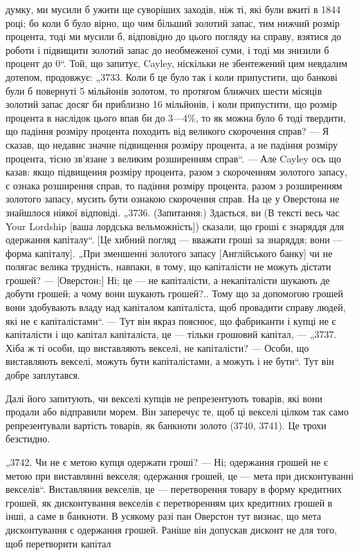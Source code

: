 думку, ми мусили б ужити ще суворіших заходів, ніж ті, які
були вжиті в 1844 році; бо коли б було вірно, що чим більший
золотий запас, тим нижчий розмір процента, тоді ми мусили б,
відповідно до цього погляду на справу, взятися до роботи і підвищити золотий запас до необмеженої
суми, і тоді ми знизили б
процент до 0“. Той, що запитує, Cayley, ніскільки не збентежений цим невдалим дотепом, продовжує:
„3733. Коли б це
було так і коли припустити, що банкові були б повернуті
5 мільйонів золотом, то протягом ближчих шести місяців золотий запас досяг би приблизно 16
мільйонів, і коли припустити,
що розмір процента в наслідок цього впав би до 3—4\%, то
як можна було б тоді твердити, що падіння розміру процента
походить від великого скорочення справ? — Я сказав, що недавнє значне підвищення розміру процента, а
не падіння розміру
процента, тісно зв’язане з великим розширенням справ“. — Але
Cayley ось що казав: якщо підвищення розміру процента, разом з скороченням золотого запасу, є ознака
розширення справ,
то падіння розміру процента, разом з розширенням золотого
запасу, мусить бути ознакою скорочення справ. На це у
Оверстона не знайшлося ніякої відповіді. „3736. (Запитання:)
Здається, ви (В тексті весь час Your Lordship [ваша лордська
вельможність]) сказали, що гроші є знаряддя для одержання
капіталу“. [Це хибний погляд — вважати гроші за знаряддя; вони — форма капіталу]. „При зменшенні
золотого запасу [Англійського банку] чи не полягає велика трудність, навпаки, в тому,
що капіталісти не можуть дістати грошей? — [Оверстон:]
Ні; це — не капіталісти, а некапіталісти шукають де добути
грошей; а чому вони шукають грошей?.. Тому що за допомогою
грошей вони здобувають владу над капіталом капіталіста, щоб
провадити справу людей, які не є капіталістами“. — Тут він
якраз пояснює, що фабриканти і купці не є капіталісти і що
капітал капіталіста, це — тільки грошовий капітал, — „3737. Хіба ж
ті особи, що виставляють векселі, не капіталісти? — Особи,
що виставляють векселі, можуть бути капіталістами, а можуть
і не бути“. Тут він добре заплутався.

Далі його запитують, чи векселі купців не репрезентують
товарів, які вони продали або відправили морем. Він заперечує те, щоб ці векселі цілком так само
репрезентували
вартість товарів, як банкноти золото (3740, 3741). Це трохи
безстидно.

„3742. Чи не є метою купця одержати гроші? — Ні; одержання грошей не є метою при виставлянні
векселя; одержання
грошей, це — мета при дисконтуванні векселів“. Виставляння
векселів, це — перетворення товару в форму кредитних грошей,
як дисконтування векселів є перетворенням цих кредитних грошей в інші, а саме в банкноти. В усякому
разі пан Оверстон тут
визнає, що мета дисконтування є одержання грошей. Раніше
він допускав дисконт не для того, щоб перетворити капітал
